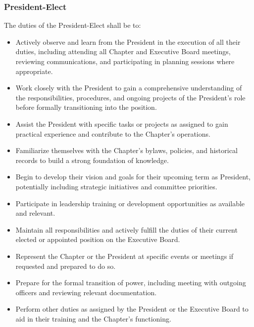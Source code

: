 \documentclass[10pt, oneside]{article}
\begin{document}
\subsubsection{President-Elect}
The duties of the President-Elect shall be to:
\begin{itemize}
    \item Actively observe and learn from the President in the execution of all their duties, including attending all Chapter and Executive Board meetings, reviewing communications, and participating in planning sessions where appropriate.
    \item Work closely with the President to gain a comprehensive understanding of the responsibilities, procedures, and ongoing projects of the President's role before formally transitioning into the position.
    \item Assist the President with specific tasks or projects as assigned to gain practical experience and contribute to the Chapter's operations.
    \item Familiarize themselves with the Chapter's bylaws, policies, and historical records to build a strong foundation of knowledge.
    \item Begin to develop their vision and goals for their upcoming term as President, potentially including strategic initiatives and committee priorities.
    \item Participate in leadership training or development opportunities as available and relevant.
     \item Maintain all responsibilities and actively fulfill the duties of their current elected or appointed position on the Executive Board.
    \item Represent the Chapter or the President at specific events or meetings if requested and prepared to do so.
    \item Prepare for the formal transition of power, including meeting with outgoing officers and reviewing relevant documentation.
    \item Perform other duties as assigned by the President or the Executive Board to aid in their training and the Chapter's functioning.
\end{itemize}
\end{document}
